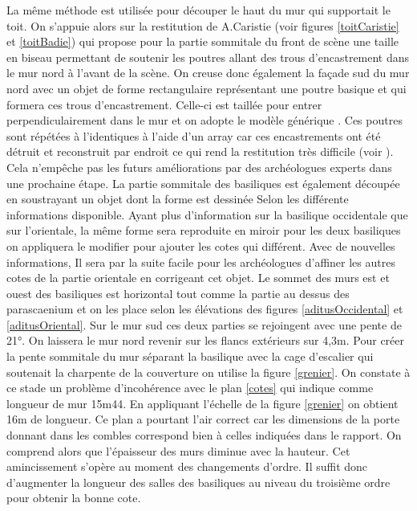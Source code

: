 La même méthode est utilisée pour découper le haut du mur qui supportait le toit. On s'appuie alors sur la restitution de A.Caristie (voir figures \ref{toitCaristie} et \ref{toitBadie}) qui propose pour la partie sommitale du front de scène une taille en biseau permettant de soutenir les poutres allant des trous d'encastrement dans le mur nord à l'avant de la scène. On creuse donc également la façade sud du mur nord avec un objet de forme rectangulaire représentant une poutre basique et qui formera ces trous d'encastrement. Celle-ci est taillée pour entrer perpendiculairement dans le mur et on adopte le modèle générique \cite[Pl. XL]{orangePl}.
Ces poutres sont répétées à l'identiques à l'aide d'un \gls{array} car ces encastrements ont été détruit et reconstruit par endroit ce qui rend la restitution très difficile (voir \cite[Pl. XXXVII]{orangePl}). Cela n'empêche pas les futurs améliorations par des archéologues experts dans une prochaine étape. La partie sommitale des basiliques est également découpée en soustrayant un objet dont la forme est dessinée Selon les différente informations disponible. Ayant plus d'information sur la basilique occidentale que sur l'orientale, la même forme sera reproduite en miroir pour les deux basiliques on appliquera le modifier pour ajouter les cotes qui différent. Avec de nouvelles informations, Il sera par la suite facile pour les archéologues d'affiner les autres cotes de la partie orientale en corrigeant cet objet. Le sommet des murs est et ouest des basiliques est horizontal tout comme la partie au dessus des \gls{parascaenium} et on les place selon les élévations des figures \ref{aditusOccidental} et \ref{aditusOriental}. Sur le mur sud ces deux parties se rejoingent avec une pente de 21°. On laissera le mur nord revenir sur les flancs extérieurs sur 4,3m. Pour créer la pente sommitale du mur séparant la basilique avec la cage d'escalier qui soutenait la charpente de la couverture on utilise la figure \ref{grenier}. On constate à ce stade un problème d'incohérence avec le plan \ref{cotes} qui indique comme longueur de mur 15m44. En appliquant l'échelle de la figure \ref{grenier} on obtient 16m de longueur. Ce plan a pourtant l'air correct car les dimensions de la porte donnant dans les combles correspond bien à celles indiquées dans le rapport. On comprend alors que l'épaisseur des murs diminue avec la hauteur. Cet amincissement s'opère au moment des changements d'ordre. Il suffit donc d'augmenter la longueur des salles des basiliques au niveau du troisième ordre pour obtenir la bonne cote.

